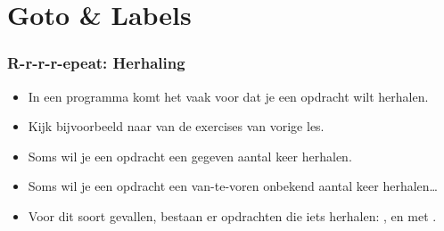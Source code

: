 \section{Goto \& Labels}

\begin{frame}
\frametitle{R-r-r-r-epeat: Herhaling}

\begin{itemize}
  \item<1-> In een programma komt het vaak voor dat je een opdracht wilt herhalen.
  \item<2-> Kijk bijvoorbeeld naar  van de exercises van vorige les.
  \item<3-> Soms wil je een opdracht een gegeven aantal keer herhalen.
  \item<5-> Soms wil je een opdracht een van-te-voren onbekend aantal keer herhalen\ldots
  \item<7-> Voor dit soort gevallen, bestaan er opdrachten die iets herhalen:
  	,  en  met .
\end{itemize}

\end{frame}



